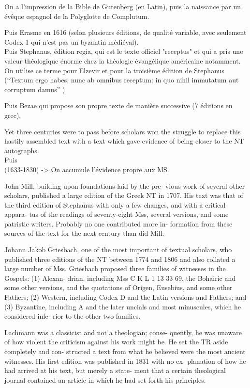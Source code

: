 On a l'impression de la Bible de Gutenberg (en Latin), puis la naissance par un évêque espagnol de la Polyglotte de Complutum.

Puis Erasme en 1616 (selon plusieurs éditions, de qualité variable, avec seulement Codex 1 qui n'est pas un byzantin médiéval).\\

Puis Stephanus, édition regia, qui est le texte officiel "receptus" et qui a pris une valeur théologique énorme chez la théologie évangélique américaine notamment. On utilise ce terme pour Elzevir et pour la troisième édition de Stephanus (“Textum ergo habes, nunc ab omnibus receptum:
in quo nihil immutatum aut corruptum damus” )

Puis Bezae qui propose son propre texte de manière successive (7 éditions en grec).

Yet three centuries were to pass before scholars won the
struggle to replace this hastily assembled text with a text which
gave evidence of being closer to the NT autographs.\\


Puis \\

(1633-1830) -> On accumule l'évidence propre aux MS.

John Mill, building upon foundations laid by the pre-
vious work of several other scholars, published a large edition
of the Greek NT in 1707. His text was that of the third edition of
Stephanus with only a few changes, and with a critical appara-
tus of the readings of seventy-eight Mss, several versions, and
some patristic writers. Probably no one contributed more in-
formation from these sources of the text for the next century
than did Mill. 



Johann Jakob Griesbach, one of the most important of textual
scholars, who published three editions of the NT between 1774
and 1806 and also collated a large number of Mss. Griesbach
proposed three families of witnesses in the Gospels: (1) Alexan-
drian, including Mss C K L 1 13 33 69, the Bohairic and some
other versions, and the quotations of Origen, Eusebius, and some
other Fathers; (2) Western, including Codex D and the Latin
versions and Fathers; and (3) Byzantine, including A and the
later uncials and most minuscules, which he considered infe-
rior to the other two families.

Lachmann was a classicist and not a theologian; conse-
quently, he was unaware of how violent the criticism against
his work might be. He set the TR aside completely and con-
structed a text from what he believed were the most ancient
witnesses. His first edition was published in 1831 with no ex-
planation of how he had arrived at his text, but merely a state-
ment that a certain theological journal contained an article in
which he had set forth his principles. 

